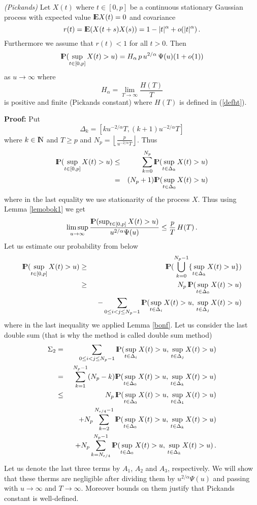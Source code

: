 \begin{theorem}
{\em (Pickands)} Let $X(t)$ where $t\in [0, p]$ be a continuous stationary Gaussian 
process with expected value ${\rm I\hspace{-0.8mm}E} X(t)=0$ and covariance 
$$
r(t)={\rm I\hspace{-0.8mm}E}(X(t+s)X(s))=1-|t|^\alpha+o(|t|^\alpha)\,.
$$
Furthermore we assume that $r(t)<1$ for all $t>0$. Then
$$
{\rm I\hspace{-0.8mm}P}(\sup_{t\in [0,p]} X(t)>u)=H_\alpha\, p\, u^{2/\alpha}\,\Psi(u)(1+o(1))
$$
as $u\rightarrow\infty$
where 
$$
H_{\alpha}=\lim_{T\rightarrow\infty}\frac{H(T)}{T}
$$
is positive and finite (Pickands constant) where $H(T)$ is defined in (\ref{defht}).
\end{theorem}
{\bf Proof:}
Put
$$
\Delta_k=[ku^{-2/\alpha}T, (k+1)u^{-2/\alpha}T]
$$
where $k\in {\rm I\hspace{-0.8mm}N}$ and $T\geq p$ and $N_p=\left\lfloor \frac{p}{u^{-2/\alpha}T}\right\rfloor$.
Thus
\begin{eqnarray*}
{\rm I\hspace{-0.8mm}P}(\sup_{t\in [0,p]} X(t)>u)&\leq& \sum_{k=0}^{N_p}{\rm I\hspace{-0.8mm}P}(\sup_{t\in \Delta_k} X(t)>u)\\
&=& (N_p+1){\rm I\hspace{-0.8mm}P}(\sup_{t\in \Delta_0} X(t)>u)
\end{eqnarray*}
where in the last equality we use stationarity of the process $X$.
Thus using Lemma \ref{lemobok1} we get
\begin{equation}\label{nierpod}
\limsup_{u\rightarrow\infty}\frac{{\rm I\hspace{-0.8mm}P}(\sup_{t\in [0,p]} X(t)>u)}{u^{2/\alpha}\Psi(u)}
\leq \frac{p}{T}\,H(T)\,.
\end{equation}
Let us estimate our probability from below 
\begin{eqnarray}
{\rm I\hspace{-0.8mm}P}(\sup_{t\in [0,p]} X(t)>u)&\geq & {\rm I\hspace{-0.8mm}P}(\bigcup_{k=0}^{N_p-1}\{\sup_{t\in \Delta_k} X(t)>u\})\nonumber\\
&\geq & N_p\,{\rm I\hspace{-0.8mm}P}(\sup_{t\in \Delta_0} X(t)>u)\label{bonsup}\\
&& \,\,\,-\sum_{0\leq i<j\leq N_p-1}{\rm I\hspace{-0.8mm}P}(\sup_{t\in \Delta_i} X(t)>u,\,\sup_{t\in \Delta_j} X(t)>u)\nonumber
\end{eqnarray}
where in the last inequality we applied Lemma \ref{bonf}. Let us consider the last double sum
(that is why the method is called double sum method)
\begin{eqnarray*}
\Sigma_2&=&\sum_{0\leq i<j\leq N_p-1}{\rm I\hspace{-0.8mm}P}(\sup_{t\in \Delta_i} X(t)>u,\,\sup_{t\in \Delta_j} X(t)>u)\\
&=& \sum_{k=1}^{N_p-1}(N_p-k){\rm I\hspace{-0.8mm}P}(\sup_{t\in \Delta_0} X(t)>u,\,\sup_{t\in \Delta_k} X(t)>u)\\
&\leq & N_p\,{\rm I\hspace{-0.8mm}P}(\sup_{t\in \Delta_0} X(t)>u,\,\sup_{t\in \Delta_1} X(t)>u)\\
&&\,\,\,\, +N_p\sum_{k=2}^{N_{\epsilon/4}-1}{\rm I\hspace{-0.8mm}P}(\sup_{t\in \Delta_0} X(t)>u,\,\sup_{t\in \Delta_k} X(t)>u)\\
&&\,\,\,\, +N_p\sum_{k=N_{\epsilon/4}}^{N_{p}-1}{\rm I\hspace{-0.8mm}P}(\sup_{t\in \Delta_0} X(t)>u,\,\sup_{t\in \Delta_k} X(t)>u)\,.
\end{eqnarray*}
Let us denote the last three terms by $A_1$, $A_2$ and $A_3$, respectively. 
We will show that these therms are negligible after dividing them by $u^{2/\alpha}\Psi(u)$ and passing with $u\rightarrow\infty$ and $T\rightarrow\infty$. Moreover bounds on them justify that Pickands constant is well-defined.

